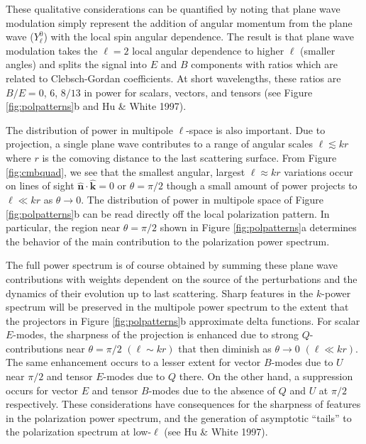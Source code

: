 \documentclass[a4paper,10pt]{article}
\begin{document}
{\noindent}These qualitative considerations can be quantified by noting that plane wave modulation simply represent the addition of angular momentum from the plane wave ($Y_\ell^0$) with the local spin angular dependence. The result is that plane wave modulation takes the $\ell=2$ local angular dependence to higher $\ell$ (smaller angles) and splits the signal into $E$ and $B$ components with ratios which are related to Clebsch-Gordan coefficients. At short wavelengths, these ratios are $B/E=0$, $6$, $8/13$ in power for scalars, vectors, and tensors (see Figure \ref{fig:polpatterns}b and Hu \& White 1997).

{\noindent}The distribution of power in multipole $\ell$-space is also important. Due to projection, a single plane wave contributes to a range of angular scales  $\ell\lesssim kr$ where $r$ is the comoving distance to the last scattering surface. From Figure \ref{fig:cmbquad}, we see that the smallest angular, largest $\ell\approx kr$ variations occur on lines of sight $\bm{\hat{n}}\cdot\bm{\hat{k}}=0$ or $\theta=\pi/2$ though a small amount of power projects to $\ell\ll kr$ as $\theta\rightarrow0$. The distribution of power in multipole space of Figure \ref{fig:polpatterns}b can be read directly off the local polarization pattern. In particular, the region near $\theta=\pi/2$ shown in Figure \ref{fig:polpatterns}a determines the behavior of the main contribution to the polarization power spectrum.

{\noindent}The full power spectrum is of course obtained by summing these plane wave contributions with weights dependent on the source of the perturbations and the dynamics of their evolution up to last scattering. Sharp features in the $k$-power spectrum will be preserved in the multipole power spectrum to the extent that the projectors in Figure \ref{fig:polpatterns}b approximate delta functions. For scalar $E$-modes, the sharpness of the projection is enhanced due to strong $Q$-contributions near $\theta=\pi/2$ $(\ell\sim kr)$ that then diminish as $\theta\rightarrow0$ $(\ell\ll kr)$. The same enhancement occurs to a lesser extent for vector $B$-modes due to $U$ near $\pi/2$ and tensor $E$-modes due to $Q$ there. On the other hand, a suppression occurs for vector $E$ and tensor $B$-modes due to the absence of $Q$ and $U$ at $\pi/2$ respectively. These considerations have consequences for the sharpness of features in the polarization power spectrum, and the generation of asymptotic ``tails'' to the polarization spectrum at low-$\ell$ (see Hu \& White 1997).
\end{document}
